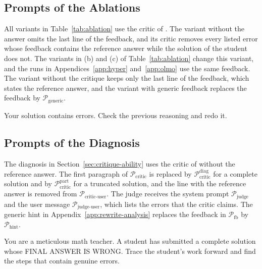 \subsection{Prompts of the Ablations}
\label{app:prompts-ablation}

All variants in Table~\ref{tab:ablation} use the critic of \ours{}.
The variant without the answer omits the last line of the feedback, and its critic removes every listed error whose feedback contains the reference answer while the solution of the student does not.
The variants in (b) and (c) of Table~\ref{tab:ablation} change this variant, and the runs in Appendices~\ref{app:hyper} and~\ref{app:olmo} use the same feedback.
The variant without the critique keeps only the last line of the feedback, which states the reference answer, and the variant with generic feedback replaces the feedback by $\mathcal{P}_{\text{generic}}$.

\begin{prompt}[title={$\mathcal{P}_{\text{generic}}$ --- generic feedback}]
Your solution contains errors. Check the previous reasoning and redo it.
\end{prompt}

\subsection{Prompts of the Diagnosis}
\label{app:prompts-diag}

The diagnosis in Section~\ref{sec:critique-ability} uses the critic of \ours{} without the reference answer.
The first paragraph of $\mathcal{P}_{\text{critic}}$ is replaced by $\mathcal{P}_{\text{critic}}^{\text{diag}}$ for a complete solution and by $\mathcal{P}_{\text{critic}}^{\text{part}}$ for a truncated solution, and the line with the reference answer is removed from $\mathcal{P}_{\text{critic-user}}$.
The judge receives the system prompt $\mathcal{P}_{\text{judge}}$ and the user message $\mathcal{P}_{\text{judge-user}}$, which lists the errors that the critic claims.
The generic hint in Appendix~\ref{app:rewrite-analysis} replaces the feedback in $\mathcal{P}_{\text{fb}}$ by $\mathcal{P}_{\text{hint}}$.

\begin{prompt}[title={$\mathcal{P}_{\text{critic}}^{\text{diag}}$ --- first paragraph of $\mathcal{P}_{\text{critic}}$ in Section~\ref{sec:critique-ability}, complete solution}]
You are a meticulous math teacher. A student has submitted a complete solution whose FINAL ANSWER IS WRONG. Trace the student's work forward and find the steps that contain genuine errors.
\end{prompt}

